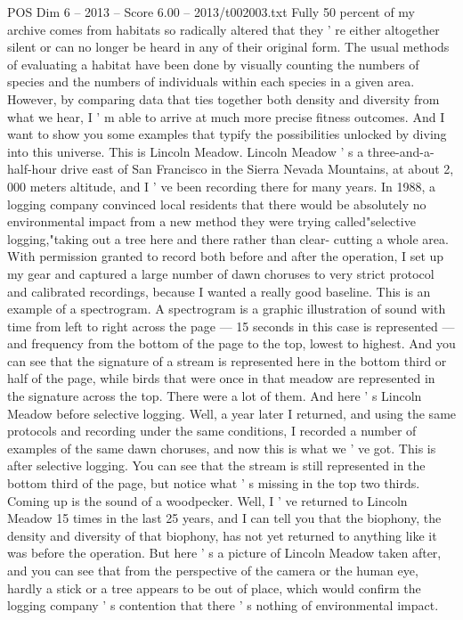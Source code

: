 \begin{textsample}{POS Dim 6 – 2013 – Score 6.00 – 2013/t002003.txt}
Fully 50 percent of my archive comes from habitats so radically altered that they ' re either altogether silent or can no longer be heard in any of their original form.
The usual methods of evaluating a habitat have been done by visually counting the numbers of species and the numbers of individuals within each species in a given area.
However, by comparing data that ties together both density and diversity from what we hear, I ' m able to arrive at much more precise fitness outcomes.
And I want to show you some examples that typify the possibilities unlocked by diving into this universe.
This is Lincoln Meadow.
Lincoln Meadow ' s a three-and-a-half-hour drive east of San Francisco in the Sierra Nevada Mountains, at about 2, 000 meters altitude, and I ' ve been recording there for many years.
In 1988, a logging company convinced local residents that there would be absolutely no environmental impact from a new method they were trying called"selective logging,"taking out a tree here and there rather than clear- cutting a whole area.
With permission granted to record both before and after the operation, I set up my gear and captured a large number of dawn choruses to very strict protocol and calibrated recordings, because I wanted a really good baseline.
This is an example of a spectrogram.
A spectrogram is a graphic illustration of sound with time from left to right across the page — 15 seconds in this case is represented — and frequency from the bottom of the page to the top, lowest to highest.
And you can see that the signature of a stream is represented here in the bottom third or half of the page, while birds that were once in that meadow are represented in the signature across the top.
There were a lot of them.
And here ' s Lincoln Meadow before selective logging.
Well, a year later I returned, and using the same protocols and recording under the same conditions, I recorded a number of examples of the same dawn choruses, and now this is what we ' ve got.
This is after selective logging.
You can see that the stream is still represented in the bottom third of the page, but notice what ' s missing in the top two thirds.
Coming up is the sound of a woodpecker.
Well, I ' ve returned to Lincoln Meadow 15 times in the last 25 years, and I can tell you that the biophony, the density and diversity of that biophony, has not yet returned to anything like it was before the operation.
But here ' s a picture of Lincoln Meadow taken after, and you can see that from the perspective of the camera or the human eye, hardly a stick or a tree appears to be out of place, which would confirm the logging company ' s contention that there ' s nothing of environmental impact.

\end{textsample}
